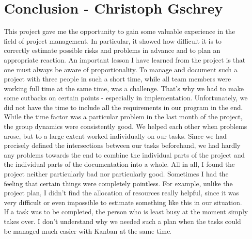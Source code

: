 \chapter{Conclusion - Christoph Gschrey}
This project gave me the opportunity to gain some valuable experience in the field of project management. In particular, it showed how difficult it is to correctly estimate possible risks and problems in advance and to plan an appropriate reaction. An important lesson I have learned from the project is that one must always be aware of proportionality. To manage and document such a project with three people in such a short time, while all team members were working full time at the same time, was a challenge. That's why we had to make some cutbacks on certain points - especially in implementation. Unfortunately, we did not have the time to include all the requirements in our program in the end. While the time factor was a particular problem in the last month of the project, the group dynamics were consistently good. We helped each other when problems arose, but to a large extent worked individually on our tasks. Since we had precisely defined the intersections between our tasks beforehand, we had hardly any problems towards the end to combine the individual parts of the project and the individual parts of the documentation into a whole. All in all, I found the project neither particularly bad nor particularly good. Sometimes I had the feeling that certain things were completely pointless. For example, unlike the project plan, I didn't find the allocation of resources really helpful, since it was very difficult or even impossible to estimate something like this in our situation. If a task was to be completed, the person who is least busy at the moment simply takes over. I don't understand why we needed such a plan when the tasks could be managed much easier with Kanban at the same time.